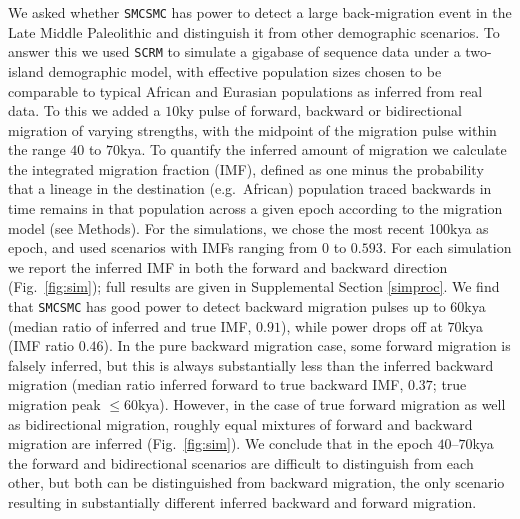We asked whether {\tt SMCSMC} has power to detect a large back-migration event in the Late Middle Paleolithic and distinguish it from other demographic scenarios. To answer this we used {\tt SCRM} \cite{Staab2015} to simulate a gigabase of sequence data under a two-island demographic model,
with effective population sizes chosen to be comparable to typical African and Eurasian populations as inferred from real data. 
To this we added a $10$ky pulse of forward, backward or bidirectional migration of varying strengths, with the midpoint of the migration pulse within the range $40$ to $70$kya.  To quantify the inferred amount of migration we calculate the integrated migration fraction (IMF), defined as one minus the probability that a lineage in the destination (e.g.\ African) population traced backwards in time remains in that population across a given epoch according to the migration model (see Methods).  For the simulations, we chose the most recent 100kya as epoch, and used scenarios with IMFs ranging from $0$ to $0.593$. For each simulation we report the inferred IMF in both the forward and backward direction (Fig.\ \ref{fig:sim}); full results are given in Supplemental Section \ref{simproc}.  We find that {\tt SMCSMC} has good power to detect backward migration pulses up to $60$kya (median ratio of inferred and true IMF, $0.91$), while power drops off at $70$kya (IMF ratio $0.46$). In the pure backward migration case, some forward migration is falsely inferred, but this is always substantially less than the inferred backward migration (median ratio inferred forward to true backward IMF, $0.37$; true migration peak $\leq 60$kya).  However, in the case of true forward migration as well as bidirectional migration, roughly equal mixtures of forward and backward migration are inferred (Fig.\ \ref{fig:sim}). We conclude that in the epoch $40$--$70$kya the forward and bidirectional scenarios are difficult to distinguish from each other, but both can be distinguished from backward migration, the only scenario resulting in substantially different inferred backward and forward migration.

